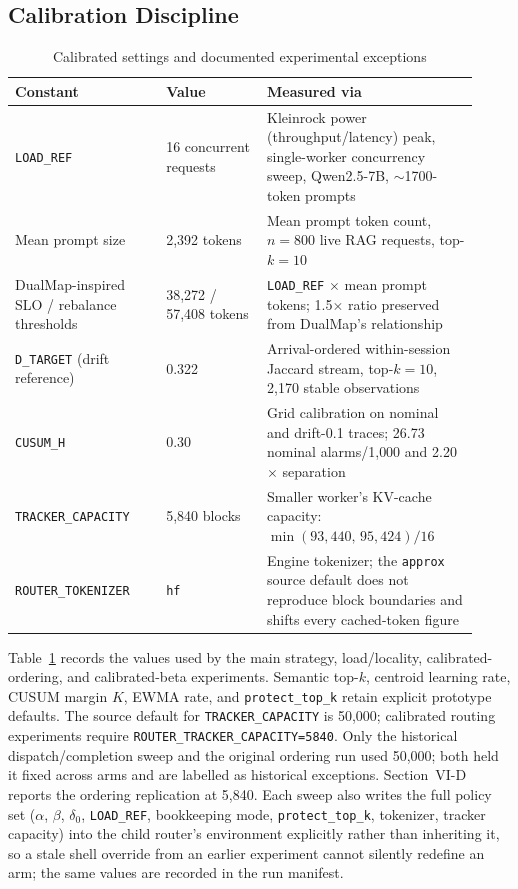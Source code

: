 \documentclass[conference]{IEEEtran}
\begin{document}
\subsection{Calibration Discipline}

\begin{table}[h]
\caption{Calibrated settings and documented experimental exceptions}
\label{tab:calibration}
\centering
\footnotesize
\setlength{\tabcolsep}{3pt}
\begin{tabular}{@{}p{0.30\linewidth}p{0.20\linewidth}p{0.42\linewidth}@{}}
\toprule
\textbf{Constant} & \textbf{Value} & \textbf{Measured via} \\
\midrule
\texttt{LOAD\_REF} & 16 concurrent requests & Kleinrock power (throughput/latency) peak, single-worker concurrency sweep, Qwen2.5-7B, $\sim$1700-token prompts \\
Mean prompt size & 2{,}392 tokens & Mean prompt token count, $n{=}800$ live RAG requests, top-$k{=}10$ \\
DualMap-inspired SLO / rebalance thresholds & 38{,}272 / 57{,}408 tokens & \texttt{LOAD\_REF} $\times$ mean prompt tokens; 1.5$\times$ ratio preserved from DualMap's relationship \\
\texttt{D\_TARGET} (drift reference) & 0.322 & Arrival-ordered within-session Jaccard stream, top-$k{=}10$, 2{,}170 stable observations \\
\texttt{CUSUM\_H} & 0.30 & Grid calibration on nominal and drift-0.1 traces; 26.73 nominal alarms/1{,}000 and 2.20$\times$ separation \\
\texttt{TRACKER\_\allowbreak CAPACITY} & 5{,}840 blocks & Smaller worker's KV-cache capacity: $\min(93{,}440,\,95{,}424)/16$ \\
\texttt{ROUTER\_\allowbreak TOKENIZER} & \texttt{hf} & Engine tokenizer; the \texttt{approx} source default does not reproduce block boundaries and shifts every cached-token figure \\
\bottomrule
\end{tabular}
\end{table}

Table~\ref{tab:calibration} records the values used by the main strategy,
load/locality, calibrated-ordering, and calibrated-beta experiments.
Semantic top-$k$, centroid learning rate,
CUSUM margin $K$, EWMA rate, and \texttt{protect\_top\_k} retain explicit
prototype defaults. The source default for \texttt{TRACKER\_CAPACITY}
is 50{,}000; calibrated routing experiments require
\texttt{ROUTER\_TRACKER\_CAPACITY=5840}. Only the historical
dispatch/completion sweep and the original ordering run used 50{,}000;
both held it fixed across arms and are labelled as historical
exceptions. Section~VI-D reports the ordering replication at 5{,}840.
Each sweep also writes the full policy set ($\alpha$, $\beta$, $\delta_0$,
\texttt{LOAD\_REF}, bookkeeping mode, \texttt{protect\_top\_k}, tokenizer,
tracker capacity) into the child router's environment explicitly rather than
inheriting it, so a stale shell override from an earlier experiment cannot
silently redefine an arm; the same values are recorded in the run manifest.
\end{document}
